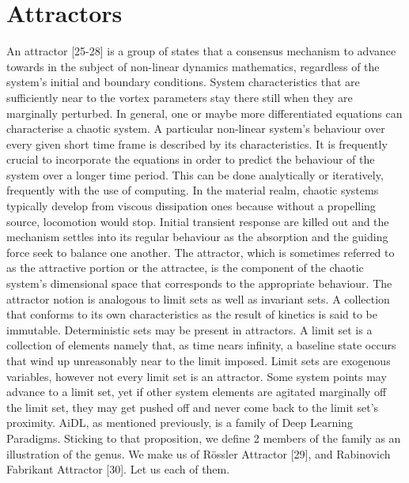 \documentclass[conference]{IEEEtran}
\begin{document}
\section{Attractors}\label{sec2}
An attractor [25-28] is a group of states that a consensus mechanism to advance towards in the subject of non-linear dynamics mathematics, regardless of the system's initial and boundary conditions. System characteristics that are sufficiently near to the vortex parameters stay there still when they are marginally perturbed. In general, one or maybe more differentiated equations can characterise a chaotic system. A particular non-linear system's behaviour over every given short time frame is described by its characteristics. It is frequently crucial to incorporate the equations in order to predict the behaviour of the system over a longer time period. This can be done analytically or iteratively, frequently with the use of computing. In the material realm, chaotic systems typically develop from viscous dissipation ones because without a propelling source, locomotion would stop. Initial transient response are killed out and the mechanism settles into its regular behaviour as the absorption and the guiding force seek to balance one another. The attractor, which is sometimes referred to as the attractive portion or the attractee, is the component of the chaotic system's dimensional space that corresponds to the appropriate behaviour. The attractor notion is analogous to limit sets as well as invariant sets. A collection that conforms to its own characteristics as the result of kinetics is said to be immutable. Deterministic sets may be present in attractors. A limit set is a collection of elements namely that, as time nears infinity, a baseline state occurs that wind up unreasonably near to the limit imposed. Limit sets are exogenous variables, however not every limit set is an attractor. Some system points may advance to a limit set, yet if other system elements are agitated marginally off the limit set, they may get pushed off and never come back to the limit set's proximity. AiDL, as mentioned previously, is a family of Deep Learning Paradigms. Sticking to that proposition, we define 2 members of the family as an illustration of the genus. We make us of Rössler Attractor [29], and Rabinovich Fabrikant Attractor [30]. Let us each of them. 
\end{document}
